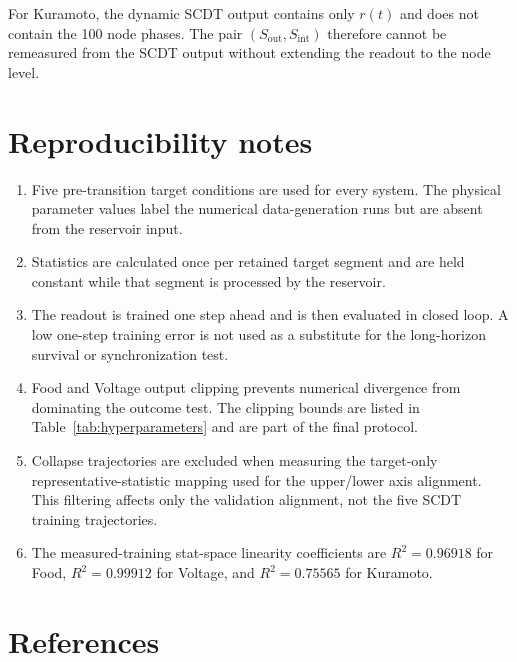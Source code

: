 \documentclass[10pt,a4paper]{article}
\begin{document}
For Kuramoto, the dynamic SCDT output contains only $r(t)$ and does not contain
the 100 node phases. The pair $(S_{\mathrm{out}},S_{\mathrm{int}})$ therefore
cannot be remeasured from the SCDT output without extending the readout to the
node level.

\section{Reproducibility notes}

\begin{enumerate}
  \item Five pre-transition target conditions are used for every system. The
  physical parameter values label the numerical data-generation runs but are
  absent from the reservoir input.
  \item Statistics are calculated once per retained target segment and are held
  constant while that segment is processed by the reservoir.
  \item The readout is trained one step ahead and is then evaluated in closed
  loop. A low one-step training error is not used as a substitute for the
  long-horizon survival or synchronization test.
  \item Food and Voltage output clipping prevents numerical divergence from
  dominating the outcome test. The clipping bounds are listed in
  Table~\ref{tab:hyperparameters} and are part of the final protocol.
  \item Collapse trajectories are excluded when measuring the target-only
  representative-statistic mapping used for the upper/lower axis alignment.
  This filtering affects only the validation alignment, not the five SCDT
  training trajectories.
  \item The measured-training stat-space linearity coefficients are
  $R^2=0.96918$ for Food, $R^2=0.99912$ for Voltage, and $R^2=0.75565$ for
  Kuramoto.
\end{enumerate}

\section{References}
\end{document}

